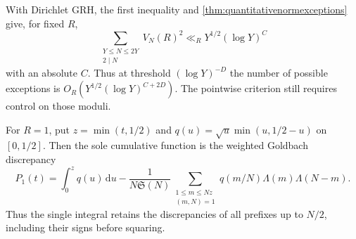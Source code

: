 \documentclass[11pt,a4paper]{article}
\numberwithin{equation}{section}
\newcommand{\SSS}{\mathfrak S}
\newcommand{\ud}{\mathrm d}
\begin{document}
With Dirichlet GRH, the first inequality and
\cref{thm:quantitativenormexceptions} give, for fixed $R$,
\[
 \sum_{\substack{Y\le N\le2Y\\2\mid N}} V_N(R)^2
        \ll_R Y^{1/2}(\log Y)^C
\]
with an absolute $C$. Thus at threshold $(\log Y)^{-D}$ the
number of possible exceptions is $O_R(Y^{1/2}(\log Y)^{C+2D})$.
The pointwise criterion still requires control on those moduli.

For $R=1$, put $z=\min(t,1/2)$ and
$q(u)=\sqrt u\min(u,1/2-u)$ on $[0,1/2]$. Then the sole
cumulative function is the weighted Goldbach discrepancy
\[
 P_1(t)=\int_0^z q(u)\,\ud u-
 \frac{1}{N\SSS(N)}
 \sum_{\substack{1\le m\le Nz\\(m,N)=1}}
     q(m/N)\Lambda(m)\Lambda(N-m).
\]
Thus the single integral retains the discrepancies of all prefixes
up to $N/2$, including their signs before squaring.
\end{document}
